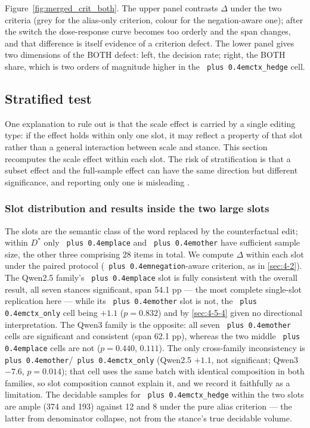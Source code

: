 \documentclass[pdflatex,sn-basic,Numbered]{sn-jnl}
\theoremstyle{thmstyleone}
\theoremstyle{thmstyletwo}
\theoremstyle{thmstylethree}
\DeclareRobustCommand{\code}[1]{\texttt{\spaceskip=0pt plus 0.4em\relax#1}}
\begin{document}
Figure~\ref{fig:merged_crit_both}. The upper panel contrasts $\Delta$ under the two criteria (grey for the alias-only criterion, colour for the negation-aware one); after the switch the dose-response curve becomes too orderly and the span changes, and that difference is itself evidence of a criterion defect. The lower panel gives two dimensions of the BOTH defect: left, the decision rate; right, the BOTH share, which is two orders of magnitude higher in the \code{ctx\_hedge} cell.

\subsection{Stratified test}
\label{sec:4-7}

One explanation to rule out is that the scale effect is carried by a single editing type: if the
effect holds within only one slot, it may reflect a property of that slot rather than a general
interaction between scale and stance. This section recomputes the scale effect within each slot.
The risk of stratification is that a subset effect and the full-sample effect can have the same
direction but different significance, and reporting only one is misleading \cite{ref30,ref43}.

\subsubsection{Slot distribution and results inside the two large slots}
\label{sec:4-7-1}

The slots are the semantic class of the word replaced by the counterfactual edit; within
$D^*$ only \code{place} and \code{other} have sufficient sample size, the other three comprising 28 items
in total. We compute $\Delta$ within each slot under the paired protocol (\code{negation}-aware
criterion, as in \ref{sec:4-2}). The Qwen2.5 family's \code{place} slot is fully consistent with the overall
result, all seven stances significant, span 54.1 pp — the most complete single-slot replication
here — while its \code{other} slot is not, the \code{ctx\_only} cell being $+1.1$ ($p = 0.832$) and by
\ref{sec:4-5-4} given no directional interpretation. The Qwen3 family is the opposite: all seven \code{other}
cells are significant and consistent (span 62.1 pp), whereas the two middle \code{place} cells are
not ($p = 0.440$, $0.111$). The only cross-family inconsistency is \code{other}/\code{ctx\_only} (Qwen2.5
$+1.1$, not significant; Qwen3 $-7.6$, $p = 0.014$); that cell uses the same batch with
identical composition in both families, so slot composition cannot explain it, and we record it
faithfully as a limitation. The decidable samples for \code{ctx\_hedge} within the two slots are ample
(374 and 193) against 12 and 8 under the pure alias criterion — the latter from denominator
collapse, not from the stance's true decidable volume.
\end{document}
